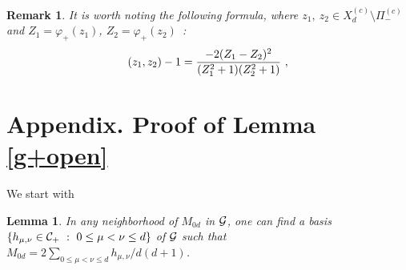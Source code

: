 \documentclass[a4paper,a4paper]{article}
\let\UnmodifSec=\section
\renewcommand{\section}{\setcounter{equation}{0}\UnmodifSec}
\newtheorem{lemma}{Lemma}[section]
\newtheorem{remark}{Remark}[section]
\def\CC{{\cal C}}
\def\GG{{\cal G}}
\def \vhi{\varphi}
\def\Xcd{X_d^{(c)}}
\begin{document}
\begin{remark}
\label{remA3}\rm
It is worth noting the following formula,
where $z_1,\ z_2 \in \Xcd \setminus \Pi_-^{(c)}$ and
$Z_1 = \vhi_+(z_1)$, $Z_2 = \vhi_+(z_2)$\ :
\begin{equation}
(z_1,z_2) -1 =
{-2(Z_1-Z_2)^2 \over (Z_1^2+1)(Z_2^2+1)}\ ,
\label{rm.1}\end{equation}
\end{remark}

\section{Appendix. Proof of Lemma \ref{g+open}}

\label{g+pf}
We start with
\begin{lemma}
\label{basis}
In any neighborhood of $M_{0d}$ in $\GG$, one can find a basis
$\{h_{\mu,\nu} \in \CC_+\ :\ 0 \le \mu < \nu \le d\}$ of $\GG$
such that
$M_{0d} = 2\sum_{0 \le \mu < \nu \le d} h_{\mu,\nu}/d(d+1)$.
\end{lemma}
\end{document}
